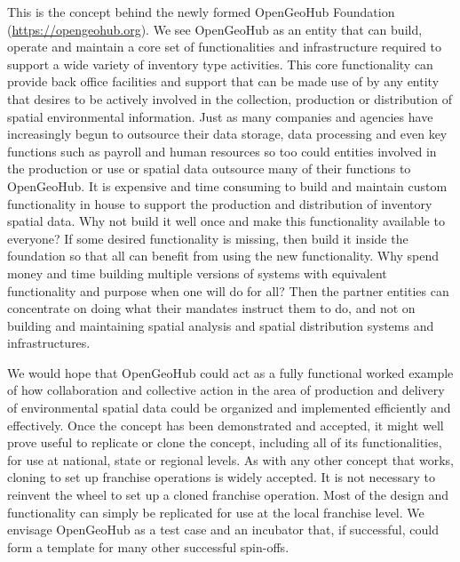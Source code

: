 \documentclass[graybox,natbib,nospthms,UStrade]{svmono}
\begin{document}
This is the concept behind the newly formed OpenGeoHub Foundation
(\url{https://opengeohub.org}). We see OpenGeoHub as an entity that can build,
operate and maintain a core set of functionalities and infrastructure
required to support a wide variety of inventory type activities.
This core functionality can provide back office facilities
and support that can be made use of by any entity that
desires to be actively involved in the collection, production or
distribution of spatial environmental information. Just as many
companies and agencies have increasingly begun to outsource their data
storage, data processing and even key functions such as payroll and
human resources so too could entities involved in the production or use
or spatial data outsource many of their functions to OpenGeoHub. It is
expensive and time consuming to build and maintain custom functionality
in house to support the production and distribution of inventory spatial
data. Why not build it well once and make this functionality available
to everyone? If some desired functionality is missing, then build it
inside the foundation so that all can benefit from using the new
functionality. Why spend money and time building multiple versions of
systems with equivalent functionality and purpose when one will do for
all? Then the partner entities can concentrate on doing what their
mandates instruct them to do, and not on building and maintaining
spatial analysis and spatial distribution systems and infrastructures.

We would hope that OpenGeoHub could act as a fully functional worked
example of how collaboration and collective action in the area of
production and delivery of environmental spatial data could be organized
and implemented efficiently and effectively. Once the concept has been
demonstrated and accepted, it might well prove useful to replicate or
clone the concept, including all of its functionalities, for use at
national, state or regional levels. As with any other concept that
works, cloning to set up franchise operations is widely accepted. It is
not necessary to reinvent the wheel to set up a cloned franchise
operation. Most of the design and functionality can simply be replicated
for use at the local franchise level. We envisage OpenGeoHub as a test
case and an incubator that, if successful, could form a template for
many other successful spin-offs.



\backmatter
\printindex
\end{document}
